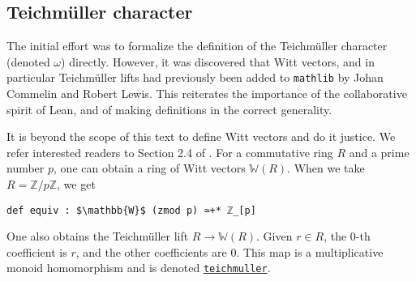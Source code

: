 \documentclass[a4paper,UKenglish,cleveref, autoref, thm-restate]{lipics-v2021}
\newcommand{\lean}[1]{\texttt{#1}\xspace} %
\begin{document}
\subsection{Teichmüller character}
The initial effort was to formalize the definition of the Teichmüller character (denoted $\omega$) directly. 
However, it was discovered that Witt vectors, and in particular Teichmüller lifts had previously 
been added to \lean{mathlib} by Johan Commelin and Robert Lewis. This reiterates the importance 
of the collaborative spirit of Lean, and of making definitions in the correct generality. 

It is beyond the scope of this text to define Witt vectors and do it justice. We refer interested readers to 
Section 2.4 of \cite{witt}. For a commutative ring $R$ and a prime number $p$, one can obtain a ring of Witt vectors $\mathbb{W}(R)$.
When we take $R = \mathbb{Z}/p \mathbb{Z}$, we get 
\begin{lstlisting}
def equiv : $\mathbb{W}$ (zmod p) ≃+* ℤ_[p]
\end{lstlisting}
One also obtains the Teichmüller lift $R \to \mathbb{W} (R)$. Given $r \in R$, 
the 0-th coefficient is $r$, and the other coefficients are 0. This map is a 
multiplicative monoid homomorphism and is denoted 
\href{https://leanprover-community.github.io/mathlib_docs/ring_theory/witt_vector/teichmuller.html#witt_vector.teichmuller}{\lean{teichmuller}}. 
\end{document}
